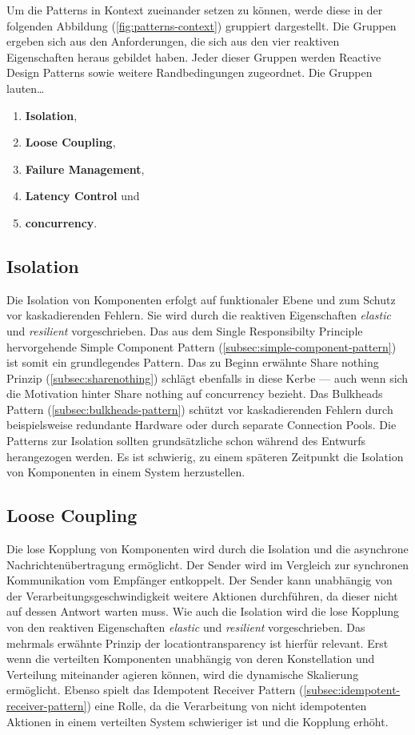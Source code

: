 Um die Patterns in Kontext zueinander setzen zu können, werde diese in der folgenden Abbildung (\ref{fig:patterns-context}) gruppiert dargestellt. Die Gruppen ergeben sich aus den Anforderungen, die sich aus den vier reaktiven Eigenschaften heraus gebildet haben. Jeder dieser Gruppen werden Reactive Design Patterns sowie weitere Randbedingungen zugeordnet. Die Gruppen lauten\ldots

\begin{enumerate}
  \item \textbf{Isolation},
  \item \textbf{Loose Coupling},
  \item \textbf{Failure Management},
  \item \textbf{Latency Control} und
  \item \textbf{\gls{concurrency}}.
\end{enumerate}

\pagebreak

\subsection{Isolation}
Die Isolation von Komponenten erfolgt auf funktionaler Ebene und zum Schutz vor kaskadierenden Fehlern. Sie wird durch die reaktiven Eigenschaften \textit{elastic} und \textit{resilient} vorgeschrieben. Das aus dem Single Responsibilty Principle hervorgehende Simple Component Pattern (\ref{subsec:simple-component-pattern}) ist somit ein grundlegendes Pattern. Das zu Beginn erwähnte Share nothing Prinzip (\ref{subsec:sharenothing}) schlägt ebenfalls in diese Kerbe --- auch wenn sich die Motivation hinter Share nothing auf \gls{concurrency} bezieht. Das Bulkheads Pattern (\ref{subsec:bulkheads-pattern}) schützt vor kaskadierenden Fehlern durch beispielsweise redundante Hardware oder durch separate Connection Pools. Die Patterns zur Isolation sollten grundsätzliche schon während des Entwurfs herangezogen werden. Es ist schwierig, zu einem späteren Zeitpunkt die Isolation von Komponenten in einem System herzustellen.

\subsection{Loose Coupling}
Die lose Kopplung von Komponenten wird durch die Isolation und die asynchrone Nachrichtenübertragung ermöglicht. Der Sender wird im Vergleich zur synchronen Kommunikation vom Empfänger entkoppelt. Der Sender kann unabhängig von der Verarbeitungsgeschwindigkeit weitere Aktionen durchführen, da dieser nicht auf dessen Antwort warten muss. Wie auch die Isolation wird die lose Kopplung von den reaktiven Eigenschaften \textit{elastic} und \textit{resilient} vorgeschrieben. Das mehrmals erwähnte Prinzip der \gls{locationtransparency} ist hierfür relevant. Erst wenn die verteilten Komponenten unabhängig von deren Konstellation und Verteilung miteinander agieren können, wird die dynamische Skalierung ermöglicht. Ebenso spielt das Idempotent Receiver Pattern (\ref{subsec:idempotent-receiver-pattern}) eine Rolle, da die Verarbeitung von nicht idempotenten Aktionen in einem verteilten System schwieriger ist und die Kopplung erhöht.

